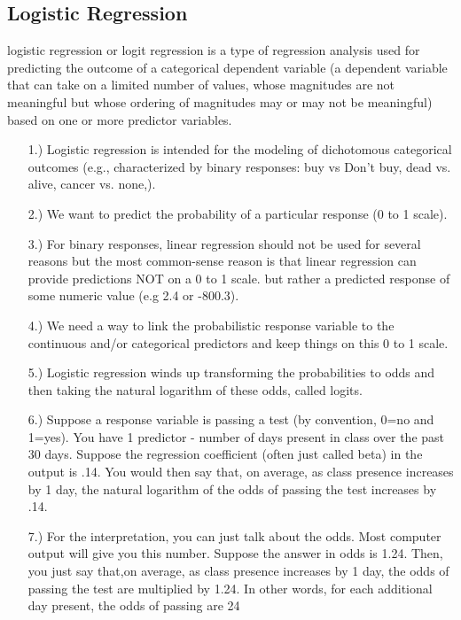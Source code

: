 ﻿\documentclass[a4paper,12pt]{article}
\begin{document}
\subsection{Logistic Regression}
logistic regression or logit regression is a type of regression analysis used for predicting
the outcome of a categorical dependent variable (a dependent variable that can take on a limited number of values,
whose magnitudes are not meaningful but whose ordering of magnitudes may or may not be meaningful)
based on one or more predictor variables.



\begin{itemize}
	\item[1.)] Logistic regression is intended for the modeling
	of dichotomous categorical outcomes (e.g., characterized by binary responses: buy vs Don't buy, dead vs. alive, cancer vs. none,).
	
	
	\item[2.)] We want to predict the probability of a particular response  (0 to 1 scale).
	
	\item[3.)] For binary responses, linear regression should not be used for several reasons
	but the most common-sense reason is that linear regression can provide predictions NOT on a 0 to 1 scale.
	but rather a predicted response of some numeric value (e.g 2.4 or -800.3).
	
	\item[4.)] We need a way to link the probabilistic response variable to the continuous and/or categorical predictors and
	keep things on this 0 to 1 scale.
	
	\item[5.)] Logistic regression winds up transforming the probabilities to odds and then taking the natural logarithm of these odds, called logits.
	
	
	\item[6.)] Suppose a response variable is passing a test (by convention, 0=no and 1=yes).
	You have 1 predictor - number of days present in class over the past 30 days.
	Suppose the regression coefficient (often just called beta) in the output is .14.
	You would then say that, on average, as class presence increases by 1 day, the natural logarithm of the
	odds of passing the test increases by .14.
	
	\item[7.)] For the interpretation, you can just talk about the odds.
	Most computer output will give you this number.
	Suppose the answer in odds is 1.24. Then, you just say that,on average, as class presence increases by 1 day,
	the odds of passing the test are multiplied by 1.24.
	In other words, for each additional day present, the odds of passing are 24%
	

\end{itemize}
\end{document}
